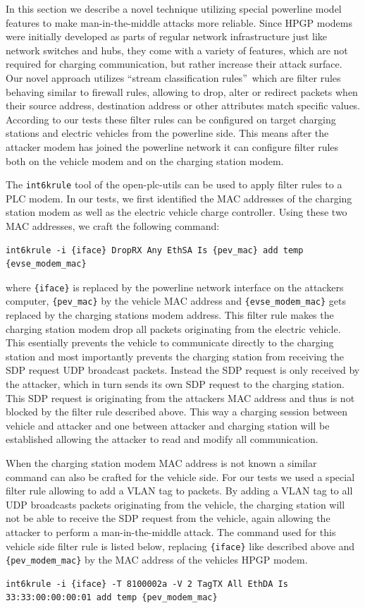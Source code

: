 \documentclass[sigconf]{acmart}
\begin{document}
In this section we describe a novel technique utilizing special powerline model features to make man-in-the-middle attacks more reliable.
Since HPGP modems were initially developed as parts of regular network infrastructure just like network switches and hubs, they come with a variety of features, which are not required for charging communication, but rather increase their attack surface.
Our novel approach utilizes \textquotedblleft stream classification rules\textquotedblright\, which are filter rules behaving similar to firewall rules, allowing to drop, alter or redirect packets when their source address, destination address or other attributes match specific values.
According to our tests these filter rules can be configured on target charging stations and electric vehicles from the powerline side.
This means after the attacker modem has joined the powerline network it can configure filter rules both on the vehicle modem and on the charging station modem.

The \texttt{int6krule} tool of the open-plc-utils \citep{qcaopen-plc-utils} can be used to apply filter rules to a PLC modem.
In our tests, we first identified the MAC addresses of the charging station modem as well as the electric vehicle charge controller.
Using these two MAC addresses, we craft the following command:
\begin{lstlisting}
int6krule -i {iface} DropRX Any EthSA Is {pev_mac} add temp {evse_modem_mac}
\end{lstlisting}
where \verb'{iface}' is replaced by the powerline network interface on the attackers computer, \verb'{pev_mac}' by the vehicle MAC address and \verb'{evse_modem_mac}' gets replaced by the charging stations modem address.
This filter rule makes the charging station modem drop all packets originating from the electric vehicle.
This esentially prevents the vehicle to communicate directly to the charging station and most importantly prevents the charging station from receiving the SDP request UDP broadcast packets.
Instead the SDP request is only received by the attacker, which in turn sends its own SDP request to the charging station.
This SDP request is originating from the attackers MAC address and thus is not blocked by the filter rule described above.
This way a charging session between vehicle and attacker and one between attacker and charging station will be established allowing the attacker to read and modify all communication.

When the charging station modem MAC address is not known a similar command can also be crafted for the vehicle side.
For our tests we used a special filter rule allowing to add a VLAN tag to packets.
By adding a VLAN tag to all UDP broadcasts packets originating from the vehicle, the charging station will not be able to receive the SDP request from the vehicle, again allowing the attacker to perform a man-in-the-middle attack.
The command used for this vehicle side filter rule is listed below, replacing \verb'{iface}' like described above and \verb'{pev_modem_mac}' by the MAC address of the vehicles HPGP modem.
\begin{lstlisting}
int6krule -i {iface} -T 8100002a -V 2 TagTX All EthDA Is 33:33:00:00:00:01 add temp {pev_modem_mac}
\end{lstlisting}
\end{document}

